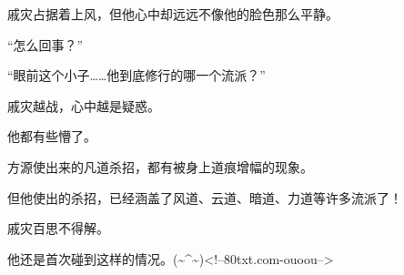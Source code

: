 \begin{this_body}
戚灾占据着上风，但他心中却远远不像他的脸色那么平静。

“怎么回事？”

“眼前这个小子……他到底修行的哪一个流派？”

戚灾越战，心中越是疑惑。

他都有些懵了。

方源使出来的凡道杀招，都有被身上道痕增幅的现象。

但他使出的杀招，已经涵盖了风道、云道、暗道、力道等许多流派了！

戚灾百思不得解。

他还是首次碰到这样的情况。(\~{}\^{}\~{})<!--80txt.com-ouoou-->

\end{this_body}

